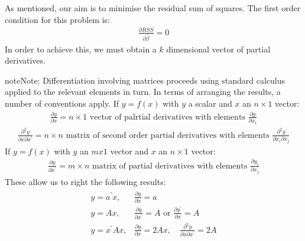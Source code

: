 \documentclass[letterpaper,10pt,english]{jupyterBook}
\begin{document}
As mentioned, our aim is to minimise the residual sum of squares. The first order condition for this problem is:
\begin{equation*}
\begin{split}
\frac{\partial R S S}{\partial \hat{\beta}}=0
\end{split}
\end{equation*}
In order to achieve this, we must obtain a \(k\) dimensional vector of partial derivatives.

\begin{sphinxadmonition}{note}{Note:}
Differentiation involving matrices proceeds using standard calculus applied to the
relevant elements in turn. In terms of arranging the results, a number of conventions
apply. If \(y = f(x)\) with \(y\) a scalar and \(x\) an \(n \times 1\) vector:
\begin{equation*}
\begin{split}
\frac{\partial y}{\partial x}=n \times 1 \text { vector of palrtial derivatives with elements } \frac{\partial y}{\partial x_{i}}
\end{split}
\end{equation*}\begin{equation*}
\begin{split}
\frac{\partial^{2} y}{\partial x \partial x^{\prime}}=n \times n \text { matrix of second order partial derivatives with elements } \frac{\partial^{2} y}{\partial x_{i} \partial x_{j}}
\end{split}
\end{equation*}
If \( y = f(x)\) with \(y\) an \(m x1\) vector and \(x\) an \(n \times 1\) vector:
\begin{equation*}
\begin{split}
\frac{\partial y}{\partial x^{\prime}}=m \times n \text { matrix of partial derivatives with elements } \frac{\partial y_{i}}{\partial x_{j}}
\end{split}
\end{equation*}
These allow us to right the following results:
\begin{equation*}
\begin{split}
\begin{array}{ll}
y=a^{\prime} x, & \frac{\partial y}{\partial x}=a \\
y=A x, & \frac{\partial y}{\partial x^{\prime}}=A \text { or } \frac{\partial y^{\prime}}{\partial x}=A \\
y=x^{\prime} A x, & \frac{\partial y}{\partial x}=2 A x, \quad \frac{\partial^{2} y}{\partial x \partial x^{\prime}}=2 A
\end{array}
\end{split}
\end{equation*}\end{sphinxadmonition}
\end{document}
